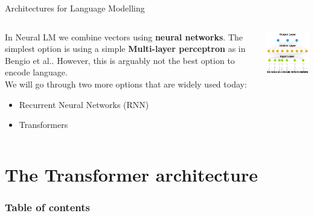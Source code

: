 \documentclass[9pt]{beamer}
\begin{document}
\begin{frame}{Architectures for Language Modelling}
\vspace{0.3cm}\\
\begin{columns}[onlytextwidth]
    \begin{column}{0.50\textwidth}
    In Neural LM we combine vectors using \textbf{neural networks}. The simplest option is using a simple \textbf{Multi-layer perceptron} as in Bengio et al.. 
    However, this is arguably not the best option to encode language.
    \vspace{0.2cm}\\ We will go through two more options that are widely used today:
    \begin{itemize}
        \item Recurrent Neural Networks (RNN)
        \item Transformers
    \end{itemize}
    \end{column}
    \begin{column}{0.50\textwidth}
        \centering
        \includegraphics[width = 6cm]{img/MLP.png}
    \end{column}
\end{columns}
\end{frame}


\section{The Transformer architecture}
\begin{frame}
    \frametitle{Table of contents}
    \tableofcontents[currentsection]
\end{frame}
\end{document}
